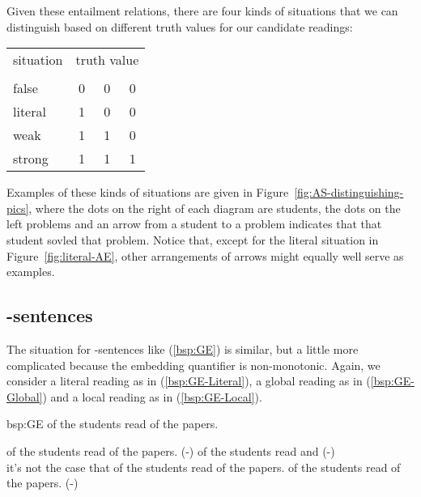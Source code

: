 \documentclass[fleqn,reqno,10pt,draft]{article}
\newcommand{\lit}{\acro{lit}}
\newcommand{\glb}{\acro{glb}}
\newcommand{\loc}{\acro{loc}}
\renewcommand{\es}{\acro{es}}
\newcommand{\mymark}[1]{{\color{mycol}{#1}}}
\begin{document}
Given these entailment relations, there are four kinds of situations
that we can distinguish based on different truth values for our
candidate readings:

\begin{center}
  \begin{tabular}{lccc}
    \toprule
    situation    & \multicolumn{3}{c}{truth value} 
  \\ 
  \cmidrule(r){2-4}
     & \lit & \glb & \loc \\ \midrule
    false   & 0 & 0 & 0 \\
    literal & 1 & 0 & 0 \\
    weak    & 1 & 1 & 0 \\
    strong  & 1 & 1 & 1 \\ \bottomrule
  \end{tabular}
\end{center}

\noindent Examples of these kinds of situations are given in
Figure~\ref{fig:AS-distinguishing-pics}, where the dots on the right
of each diagram are students, the dots on the left problems and an
arrow from a student to a problem indicates that that student sovled
that problem. Notice that, except for the literal
situation in
Figure~\ref{fig:literal-AE},
other arrangements of arrows might equally well serve as examples.

\subsection{\es-sentences}
\label{sec:es-sentences}

The situation for \es-sentences like (\ref{bsp:GE}) is similar, but a
little more complicated because the embedding quantifier is
non-monotonic. Again, we consider a literal reading as in
(\ref{bsp:GE-Literal}), a global reading as in (\ref{bsp:GE-Global})
and a local reading as in (\ref{bsp:GE-Local}).

\begin{exer}{bsp:GE}
\ex \mymark{Exactly one} of the students read {\mymark{some}} of the
  papers.

  \begin{xlist}
  \ex \mymark{Exactly one} of the students read
    {\mymark{some and maybe all}} of the papers. \hfill (\es-\lit)
  \ex 
    \mymark{Exactly one} of the students read \mymark{some} 
    and  \hfill (\es-\glb)\\
    it's not the case that \mymark{exactly one} of the students read \mymark{all} of the papers.
  \ex 
    \mymark{Exactly one} of the students read {\mymark{some  but not all}} of the
    papers. \hfill (\es-\loc)
  \end{xlist}
\end{exer}
\end{document}
